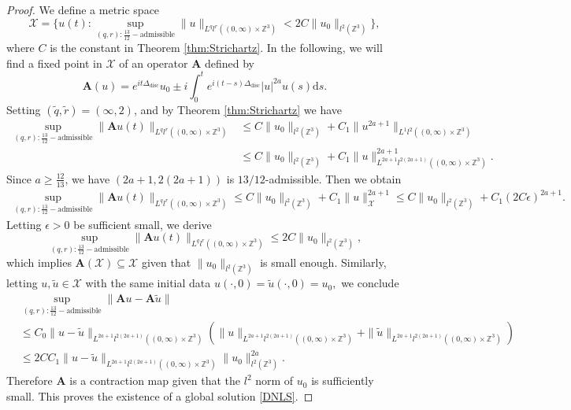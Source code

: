 \documentclass[12pt]{amsart}
\newcommand{\Z}{\mathbb{Z}}
\begin{document}
\begin{proof}
   We define a metric space
    \[
    \mathcal{X}=\{u(t):\sup_{(q,r):\mathrm{\frac{13}{12}-admissible}}\|u\|_{L^ql^r\left(\left(0,\infty\right)\times\Z^{3}\right)}<2C\|u_0\|_{l^2(\mathbb{Z}^3)}\},
    \]
 where $C$ is the constant in Theorem \ref{thm:Strichartz}. In the following, we will find a fixed point in $\mathcal{X}$ of an operator $\mathbf{A}$ defined by 
    \[
\mathbf{A}(u)=e^{it\Delta_{\mathrm{disc}}}u_0 \pm i\int_0^te^{i(t-s)\Delta_{\mathrm{disc}}}|u|^{2a}u(s)\mathrm{d}s.
    \]
    Setting $(\tilde{q},\tilde{r})=(\infty,2)$, and by Theorem \ref{thm:Strichartz} we have
    \begin{align*}
        \sup_{(q,r):\mathrm{\frac{13}{12}-admissible}}\|\mathbf{A}u(t)\|_{L^ql^r\left(\left(0,\infty\right)\times\Z^{3}\right)}&\le C\|u_0\|_{l^2(\mathbb{Z}^3)}+C_1\|u^{2a+1}\|_{L^1l^2\left(\left(0,\infty\right)\times\Z^{3}\right)} \\
         &\le C\|u_0\|_{l^2(\mathbb{Z}^3)}+C_1\|u\|^{2a+1}_{L^{2a+1}l^{2(2a+1)}\left(\left(0,\infty\right)\times\Z^{3}\right)}.    \end{align*}
Since $a\ge\frac{12}{13}$, we have $(2a+1,2(2a+1))$ is $13/12$-admissible. Then we obtain
\begin{align*}
    \sup_{(q,r):\mathrm{\frac{13}{12}-admissible}} \|\mathbf{A}u(t)\|_{L^ql^r\left(\left(0,\infty\right)\times\Z^{3}\right)}\le C\|u_0\|_{l^2(\mathbb{Z}^3)}+C_1\|u\|_{\mathcal{X}}^{2a+1}
    \le C\|u_0\|_{l^2(\mathbb{Z}^3)}+C_1(2C\epsilon)^{2a+1}.
\end{align*}
    Letting $\epsilon>0$ be sufficient small,  we derive 
    \[
    \sup_{(q,r):\mathrm{\frac{13}{12}-admissible}}\|\mathbf{A}u(t)\|_{L^ql^r\left(\left(0,\infty\right)\times\Z^{3}\right)}\le2C\|u_0\|_{l^2(\mathbb{Z}^3)},
    \]
which implies $\mathbf{A}(\mathcal{X})\subseteq \mathcal{X}$ given that $\|u_0\|_{l^2(\mathbb{Z}^3)}$ is small enough. Similarly, 
letting $u,\tilde{u}\in \mathcal{X}$ with the same initial data $u(\cdot,0)=\tilde{u}(\cdot,0)=u_0,$ we conclude
\begin{align*}
    &\sup_{(q,r):\mathrm{\frac{13}{12}-admissible}}\|\mathbf{A}u-\mathbf{A}\tilde{u}\| \\
    &\le C_0\|u-\tilde{u}\|_{L^{2a+1}l^{2(2a+1)}\left(\left(0,\infty\right)\times\Z^{3}\right)}(\|u\|_{L^{2a+1}l^{2(2a+1)}\left(\left(0,\infty\right)\times\Z^{3}\right)}+\|\tilde{u}\|_{L^{2a+1}l^{2(2a+1)}\left(\left(0,\infty\right)\times\Z^{3}\right)})\\
&\le2CC_1\|u-\tilde{u}\|_{L^{2a+1}l^{2(2a+1)}\left(\left(0,\infty\right)\times\Z^{3}\right)}\|u_0\|_{l^2(\mathbb{Z}^3)}^{2a}.
\end{align*}
Therefore $\mathbf{A}$ is a contraction map given that the $l^2$ norm of $u_0$ is sufficiently small.
This proves the existence of a global solution \eqref{DNLS}.
\end{proof}
\end{document}
